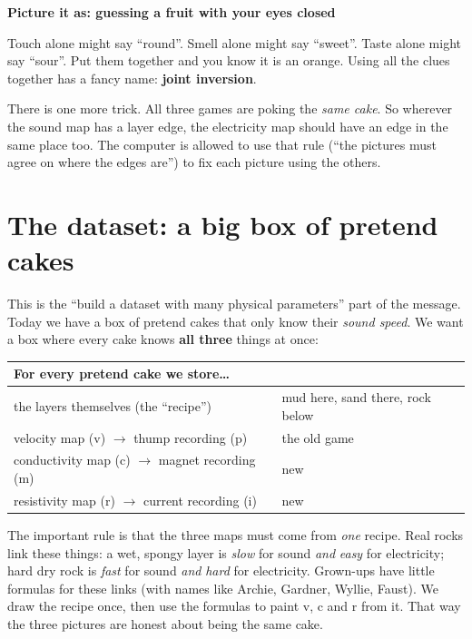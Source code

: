 \documentclass[11pt,a4paper]{article}
\newenvironment{storybox}[1]
  {\par\medskip\noindent
   \begin{lrbox}{\storyboxsave}
   \begin{minipage}{\dimexpr\linewidth-2\fboxsep-2\fboxrule\relax}
   \textbf{#1}\par\smallskip}
  {\end{minipage}\end{lrbox}%
   \fcolorbox{rule}{boxbg}{\usebox{\storyboxsave}}\par\medskip}
\begin{document}
\begin{storybox}{Picture it as: guessing a fruit with your eyes closed}
Touch alone might say ``round''. Smell alone might say ``sweet''. Taste alone might say ``sour''.
Put them together and you know it is an orange. Using all the clues together has a
fancy name: \textbf{joint inversion}.
\end{storybox}

There is one more trick. All three games are poking the \emph{same cake}.
So wherever the sound map has a layer edge, the electricity map should have an edge
in the same place too. The computer is allowed to use that rule (``the pictures must agree
on where the edges are'') to fix each picture using the others.

\section*{The dataset: a big box of pretend cakes}

This is the ``build a dataset with many physical parameters'' part of the message.
Today we have a box of pretend cakes that only know their \emph{sound speed}.
We want a box where every cake knows \textbf{all three} things at once:

\begin{center}
\begin{tabular}{@{}ll@{}}
\toprule
For every pretend cake we store\ldots & \\
\midrule
the layers themselves (the ``recipe'') & mud here, sand there, rock below \\
velocity map (v) $\to$ thump recording (p) & the old game \\
conductivity map (c) $\to$ magnet recording (m) & new \\
resistivity map (r) $\to$ current recording (i) & new \\
\bottomrule
\end{tabular}
\end{center}

The important rule is that the three maps must come from \emph{one} recipe.
Real rocks link these things: a wet, spongy layer is \emph{slow} for sound \emph{and}
\emph{easy} for electricity; hard dry rock is \emph{fast} for sound \emph{and} \emph{hard}
for electricity. Grown-ups have little formulas for these links (with names like Archie,
Gardner, Wyllie, Faust). We draw the recipe once, then use the formulas to paint
v, c and r from it. That way the three pictures are honest about being the same cake.
\end{document}
